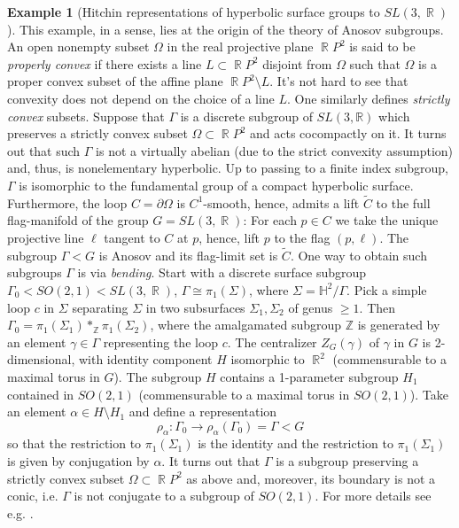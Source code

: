 \documentclass[12pt]{amsbook}%
\theoremstyle{definition}
\newtheorem{example}[thm]{Example}
\theoremstyle{remark}
\numberwithin{section}{chapter}
\numberwithin{subsection}{section}
\numberwithin{figure}{chapter}
\DeclareMathOperator{\R}{\mathbb{R}}
\def\bZ{{\mathbb{Z}}}
\def\Ga{\Gamma}
\def\ga{\gamma}
\def\al{\alpha}
\def\kap{}
\begin{document}
{{\begin{example} [Hitchin representations of hyperbolic surface groups to $SL(3,\R)$] \label{ex:hitchin}
{\kap This example, in a sense, lies at the origin of the theory of Anosov subgroups. An open nonempty subset $\Omega$ in the real projective plane $\R P^2$ is said to be 
{\em properly convex} 
if there exists a line $L\subset \R P^2$ disjoint from $\Omega$ such that $\Omega$ is a proper convex subset of the affine plane $\R P^2 \setminus L$. It's not hard to see that convexity does not depend on the choice of a line $L$. One similarly defines {\em strictly convex} subsets. 
Suppose that $\Ga$ is a discrete subgroup of $SL(3,\mathbb R)$ which preserves a strictly convex subset $\Omega\subset \R P^2$ and acts cocompactly on it. It turns out that such $\Ga$ is not a virtually abelian (due to the strict convexity assumption) and, thus, is nonelementary hyperbolic. Up to passing to a finite index subgroup, $\Ga$ is isomorphic to the fundamental group of a compact hyperbolic surface. Furthermore, the loop 
$C=\partial \Omega$ is $C^1$-smooth, hence,  admits a lift $\tilde C$ to the full flag-manifold of the group $G=SL(3,\R)$: For each $p\in C$ we take the unique projective line $\ell$ tangent to $C$ at $p$, hence, lift $p$ to the flag $(p,\ell)$. 
The subgroup $\Ga< G$ is Anosov and its flag-limit set is $\tilde C$. One way to obtain such subgroups $\Ga$ is via {\em bending}. Start with a discrete surface subgroup $\Ga_0< SO(2,1)< SL(3,\R)$, $\Ga\cong \pi_1(\Sigma)$, where $\Sigma=\mathbb H^2/\Gamma$. Pick a simple loop $c$ in $\Sigma$ separating $\Sigma$ in two subsurfaces $\Sigma_1, \Sigma_2$ of genus $\ge 1$. Then $\Ga_0=\pi_1(\Sigma_1)*_{\mathbb Z} \pi_1(\Sigma_2)$, where the amalgamated subgroup $\bZ$ is generated by an element $\ga\in \Ga$ representing the loop $c$. The centralizer $Z_G(\gamma)$ of $\gamma$ in $G$ is 2-dimensional, with identity component $H$ isomorphic to $\R^2$ (commensurable to a maximal torus in $G$). The subgroup $H$ contains a 1-parameter subgroup $H_1$ contained in $SO(2,1)$ (commensurable to a maximal torus in $SO(2,1)$). Take an element $\alpha\in H\setminus H_1$ and define a representation
$$
\rho_\al: \Ga_0\to \rho_\al(\Ga_0)=\Ga< G 
$$
so that the restriction to $\pi_1(\Sigma_1)$ is the identity and the restriction to $\pi_1(\Sigma_1)$ is given by conjugation by $\al$. It turns out that $\Ga$ is a subgroup preserving a strictly convex subset $\Omega\subset \R P^2$ as above and, moreover, its boundary is not a conic, i.e. $\Ga$ is not conjugate to a subgroup of $SO(2,1)$. For more details see e.g. \cite{Labourie-book}.} 
\end{example}


}}
\end{document}
